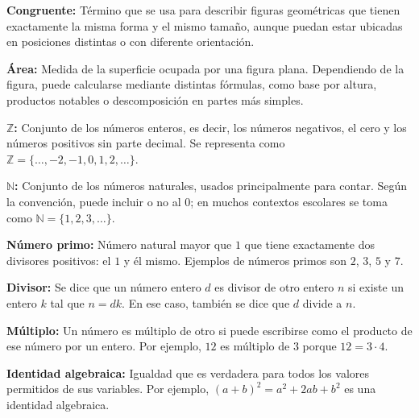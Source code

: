 \documentclass[12pt,final]{report}
\theoremstyle{plain}
\theoremstyle{definition}
\begin{document}
\vspace{0.5em}

\textbf{Congruente:} Término que se usa para describir figuras geométricas que tienen exactamente la misma forma y el mismo tamaño, aunque puedan estar ubicadas en posiciones distintas o con diferente orientación.

\vspace{0.5em}

\textbf{Área:} Medida de la superficie ocupada por una figura plana. Dependiendo de la figura, puede calcularse mediante distintas fórmulas, como base por altura, productos notables o descomposición en partes más simples.

\vspace{0.5em}

\textbf{$\mathbb{Z}$:} Conjunto de los números enteros, es decir, los números negativos, el cero y los números positivos sin parte decimal. Se representa como $\mathbb{Z} = \{\ldots, -2, -1, 0, 1, 2, \ldots\}$.

\vspace{0.5em}

\textbf{$\mathbb{N}$:} Conjunto de los números naturales, usados principalmente para contar. Según la convención, puede incluir o no al $0$; en muchos contextos escolares se toma como $\mathbb{N} = \{1, 2, 3, \ldots\}$.

\vspace{0.5em}

\textbf{Número primo:} Número natural mayor que $1$ que tiene exactamente dos divisores positivos: el $1$ y él mismo. Ejemplos de números primos son $2$, $3$, $5$ y $7$.

\vspace{0.5em}

\textbf{Divisor:} Se dice que un número entero $d$ es divisor de otro entero $n$ si existe un entero $k$ tal que $n = dk$. En ese caso, también se dice que $d$ divide a $n$.

\vspace{0.5em}

\textbf{Múltiplo:} Un número es múltiplo de otro si puede escribirse como el producto de ese número por un entero. Por ejemplo, $12$ es múltiplo de $3$ porque $12 = 3 \cdot 4$.

\vspace{0.5em}

\textbf{Identidad algebraica:} Igualdad que es verdadera para todos los valores permitidos de sus variables. Por ejemplo, $(a+b)^2 = a^2 + 2ab + b^2$ es una identidad algebraica.
\end{document}
